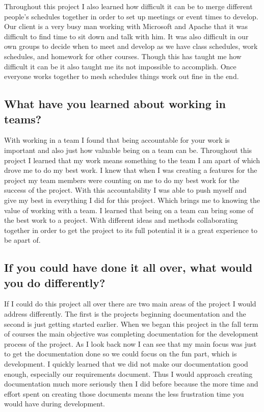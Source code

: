 \documentclass[draftclsnofoot,10pt,onecolumn]{IEEEtran} %
\begin{document}
Throughout this project I also learned how difficult it can be to merge
different people's schedules together in order to set up meetings or event times
to develop. Our client is a very busy man working with Microsoft and Apache that
it was difficult to find time to sit down and talk with him. It was also
difficult in our own groups to decide when to meet and develop as we have class
schedules, work schedules, and homework for other courses. Though this has
taught me how difficult it can be it also taught me its not impossible to
accomplish. Once everyone works together to mesh schedules things work out fine
in the end.

\subsection{What have you learned about working in teams?}

With working in a team I found that being accountable for your work is important
and also just how valuable being on a team can be. Throughout this project I
learned that my work means something to the team I am apart of which drove me to
do my best work. I knew that when I was creating a features for the project my
team members were counting on me to do my best work for the success of the
project. With this accountability I was able to push myself and give my best in
everything I did for this project. Which brings me to knowing the value of
working with a team. I learned that being on a team can bring some of the best
work to a project. With different ideas and methods collaborating together in
order to get the project to its full potential it is a great experience to be
apart of.

\subsection{If you could have done it all over, what would you do differently?}

If I could do this project all over there are two main areas of the project I
would address differently. The first is the projects beginning documentation and
the second is just getting started earlier. When we began this project in the
fall term of courses the main objective was completing documentation for the
development process of the project. As I look back now I can see that my main
focus was just to get the documentation done so we could focus on the fun part,
which is development. I quickly learned that we did not make our documentation
good enough, especially our requirements document.  Thus I would approach
creating documentation much more seriously then I did before because the more
time and effort spent on creating those documents means the less frustration
time you would have during development. \\
\end{document}

